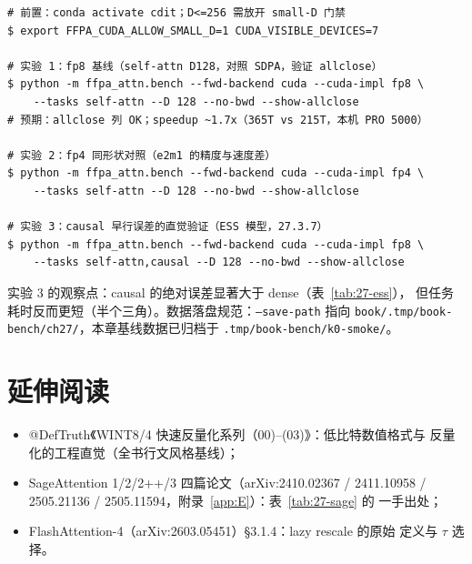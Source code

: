 \begin{lstlisting}[style=console]
# 前置：conda activate cdit；D<=256 需放开 small-D 门禁
$ export FFPA_CUDA_ALLOW_SMALL_D=1 CUDA_VISIBLE_DEVICES=7

# 实验 1：fp8 基线（self-attn D128，对照 SDPA，验证 allclose）
$ python -m ffpa_attn.bench --fwd-backend cuda --cuda-impl fp8 \
    --tasks self-attn --D 128 --no-bwd --show-allclose
# 预期：allclose 列 OK；speedup ~1.7x（365T vs 215T，本机 PRO 5000）

# 实验 2：fp4 同形状对照（e2m1 的精度与速度差）
$ python -m ffpa_attn.bench --fwd-backend cuda --cuda-impl fp4 \
    --tasks self-attn --D 128 --no-bwd --show-allclose

# 实验 3：causal 早行误差的直觉验证（ESS 模型，27.3.7）
$ python -m ffpa_attn.bench --fwd-backend cuda --cuda-impl fp8 \
    --tasks self-attn,causal --D 128 --no-bwd --show-allclose
\end{lstlisting}

实验 3 的观察点：causal 的绝对误差显著大于 dense（表~\ref{tab:27-ess}），
但任务耗时反而更短（半个三角）。数据落盘规范：\texttt{--save-path} 指向
\texttt{book/.tmp/book-bench/ch27/}，本章基线数据已归档于
\texttt{.tmp/book-bench/k0-smoke/}。

\section*{延伸阅读}

\begin{itemize}[itemsep=1pt,topsep=2pt]
  \item @DefTruth《WINT8/4 快速反量化系列（00)--(03)》：低比特数值格式与
        反量化的工程直觉（全书行文风格基线）；
  \item SageAttention 1/2/2++/3 四篇论文（arXiv:2410.02367 / 2411.10958 /
        2505.21136 / 2505.11594，附录~\ref{app:E}）：表~\ref{tab:27-sage} 的
        一手出处；
  \item FlashAttention-4（arXiv:2603.05451）\S 3.1.4：lazy rescale 的原始
        定义与 $\tau$ 选择。
\end{itemize}
